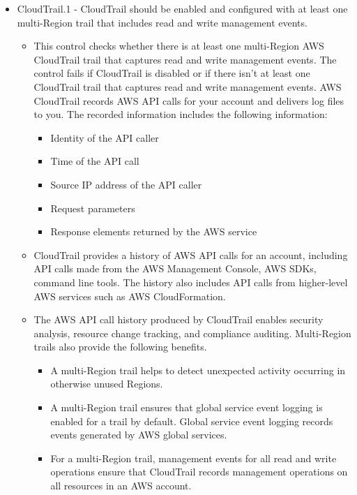 \begin{mdframed}[backgroundcolor=gray!05, linecolor=gray!50]
\itshape
\begin{itemize}
    \item CloudTrail.1 - CloudTrail should be enabled and configured with at least one multi-Region trail that includes read and write management events.
    \begin{itemize}
        \item This control checks whether there is at least one multi-Region AWS CloudTrail trail that captures read and write management events. The control fails if CloudTrail is disabled or if there isn't at least one CloudTrail trail that captures read and write management events. AWS CloudTrail records AWS API calls for your account and delivers log files to you. The recorded information includes the following information:
        \begin{itemize}
            \item Identity of the API caller
            \item Time of the API call
            \item Source IP address of the API caller
            \item Request parameters
            \item Response elements returned by the AWS service
        \end{itemize}
        \item CloudTrail provides a history of AWS API calls for an account, including API calls made from the AWS Management Console, AWS SDKs, command line tools. The history also includes API calls from higher-level AWS services such as AWS CloudFormation.
        \item The AWS API call history produced by CloudTrail enables security analysis, resource change tracking, and compliance auditing. Multi-Region trails also provide the following benefits.
        \begin{itemize}
            \item A multi-Region trail helps to detect unexpected activity occurring in otherwise unused Regions.
            \item A multi-Region trail ensures that global service event logging is enabled for a trail by default. Global service event logging records events generated by AWS global services.
            \item For a multi-Region trail, management events for all read and write operations ensure that CloudTrail records management operations on all resources in an AWS account.

\end{itemize}
\end{itemize}
\end{itemize}
\end{mdframed}
